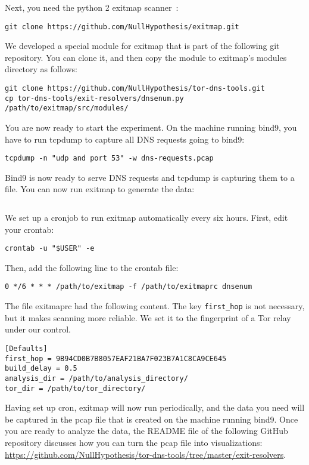 Next, you need the python 2 exitmap scanner~\cite{exitmap}:

\begin{lstlisting}
git clone https://github.com/NullHypothesis/exitmap.git
\end{lstlisting}

We developed a special module for exitmap that is part of the following git
repository.  You can clone it, and then copy the module to exitmap's modules
directory as follows:

\begin{lstlisting}
git clone https://github.com/NullHypothesis/tor-dns-tools.git
cp tor-dns-tools/exit-resolvers/dnsenum.py /path/to/exitmap/src/modules/
\end{lstlisting}

You are now ready to start the experiment.  On the machine running bind9, you
have to run tcpdump to capture all DNS requests going to bind9:

\begin{lstlisting}
tcpdump -n "udp and port 53" -w dns-requests.pcap
\end{lstlisting}

Bind9 is now ready to serve DNS requests and tcpdump is capturing them to a
file.  You can now run exitmap to generate the data:

\begin{lstlisting}

\end{lstlisting}

We set up a cronjob to run exitmap automatically every six hours.
First, edit your crontab:
\begin{lstlisting}
crontab -u "$USER" -e
\end{lstlisting}
Then, add the following line to the crontab file:
\begin{lstlisting}
0 */6 * * * /path/to/exitmap -f /path/to/exitmaprc dnsenum
\end{lstlisting}

The file exitmaprc had the following content.  The key \texttt{first\_hop} is
not necessary, but it makes scanning more reliable.  We set it to the
fingerprint of a Tor relay under our control.
\begin{lstlisting}
[Defaults]
first_hop = 9B94CD0B7B8057EAF21BA7F023B7A1C8CA9CE645
build_delay = 0.5
analysis_dir = /path/to/analysis_directory/
tor_dir = /path/to/tor_directory/
\end{lstlisting}

Having set up cron, exitmap will now run periodically, and the data you need
will be captured in the pcap file that is created on the machine running bind9.
Once you are ready to analyze the data, the README file of the following GitHub
repository discusses how you can turn the pcap file into visualizations:
\url{https://github.com/NullHypothesis/tor-dns-tools/tree/master/exit-resolvers}.

